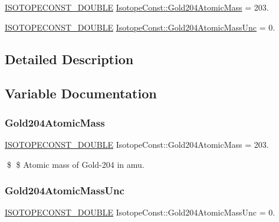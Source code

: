 \begin{DoxyCompactItemize}
\item 
\mbox{\hyperlink{group___isotope_const-_macros_ga8f45a7272ce02c0b4c65c44636ed719a}{I\+S\+O\+T\+O\+P\+E\+C\+O\+N\+S\+T\+\_\+\+D\+O\+U\+B\+LE}} \mbox{\hyperlink{group___isotope_const-_gold-_au204_ga0881010abf3fa67643549df35c581091}{Isotope\+Const\+::\+Gold204\+Atomic\+Mass}} = 203.
\item 
\mbox{\hyperlink{group___isotope_const-_macros_ga8f45a7272ce02c0b4c65c44636ed719a}{I\+S\+O\+T\+O\+P\+E\+C\+O\+N\+S\+T\+\_\+\+D\+O\+U\+B\+LE}} \mbox{\hyperlink{group___isotope_const-_gold-_au204_ga9a01a4f09d26891bfad4a2f81817b37f}{Isotope\+Const\+::\+Gold204\+Atomic\+Mass\+Unc}} = 0.
\end{DoxyCompactItemize}


\subsection{Detailed Description}


\subsection{Variable Documentation}
\mbox{\label{group___isotope_const-_gold-_au204_ga0881010abf3fa67643549df35c581091}} 
\subsubsection{\texorpdfstring{Gold204\+Atomic\+Mass}{Gold204AtomicMass}}
{\footnotesize\ttfamily \mbox{\hyperlink{group___isotope_const-_macros_ga8f45a7272ce02c0b4c65c44636ed719a}{I\+S\+O\+T\+O\+P\+E\+C\+O\+N\+S\+T\+\_\+\+D\+O\+U\+B\+LE}} Isotope\+Const\+::\+Gold204\+Atomic\+Mass = 203.}

\$ \$ Atomic mass of Gold-\/204 in amu. \mbox{\label{group___isotope_const-_gold-_au204_ga9a01a4f09d26891bfad4a2f81817b37f}} 
\subsubsection{\texorpdfstring{Gold204\+Atomic\+Mass\+Unc}{Gold204AtomicMassUnc}}
{\footnotesize\ttfamily \mbox{\hyperlink{group___isotope_const-_macros_ga8f45a7272ce02c0b4c65c44636ed719a}{I\+S\+O\+T\+O\+P\+E\+C\+O\+N\+S\+T\+\_\+\+D\+O\+U\+B\+LE}} Isotope\+Const\+::\+Gold204\+Atomic\+Mass\+Unc = 0.}

